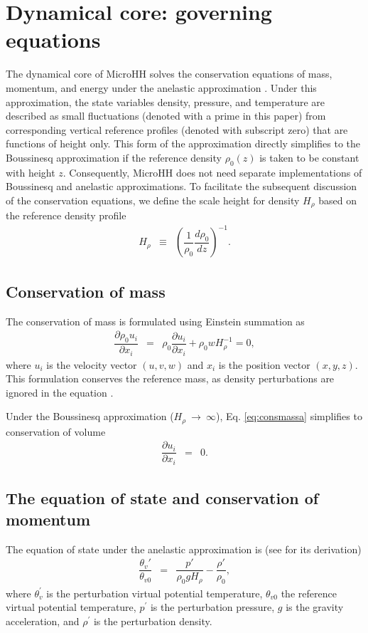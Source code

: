 \documentclass[gmd,manuscript]{copernicus}
\begin{document}
\section{Dynamical core: governing equations}\label{sec:dyncore}
The dynamical core of MicroHH solves the conservation equations of mass, momentum, and energy under the anelastic approximation \citep{Bannon1996}. Under this approximation, the state variables density, pressure, and temperature are described as small fluctuations (denoted with a prime in this paper) from corresponding vertical reference profiles (denoted with subscript zero) that are functions of height only. This form of the approximation directly simplifies to the Boussinesq approximation if the reference density $\rho_0 (z)$ is taken to be constant with height $z$. Consequently, MicroHH does not need separate implementations of Boussinesq and anelastic approximations. To facilitate the subsequent discussion of the conservation equations, we define the scale height for density $H_\rho$ based on the reference density profile
\begin{eqnarray}
H_{\rho} & \equiv & \left( \dfrac{1}{\rho_0} \dfrac{d \rho_0}{dz} \right)^{-1}.
\end{eqnarray}

\subsection{Conservation of mass}
The conservation of mass is formulated using Einstein summation as
\begin{eqnarray}
\dfrac{\partial \rho_0 u_i}{\partial x_i} & = & \rho_0 \dfrac{\partial u_i}{\partial x_i} + \rho_0 w H_{\rho}^{-1} = 0, \label{eq:consmassa}
\end{eqnarray}
where $u_i$ is the velocity vector $(u,v,w)$ and $x_i$ is the position vector $(x,y,z)$. This formulation conserves the reference mass, as density perturbations are ignored in the equation \citep{Lilly1996}.

Under the Boussinesq approximation ($H_{\rho}~\rightarrow~\infty$), Eq. \ref{eq:consmassa} simplifies to conservation of volume
\begin{eqnarray}
\dfrac{\partial u_i}{\partial x_i} & = & 0. \label{eq:consmassb}
\end{eqnarray}

\subsection{The equation of state and conservation of momentum}
The equation of state under the anelastic approximation is (see \citet{Bannon1996} for its derivation)
\begin{eqnarray}
\dfrac{\theta_v'}{\theta_{v0}} & = & \dfrac{p'}{\rho_0 g H_{\rho}} - \dfrac{\rho'}{\rho_0},\label{eq:statea}
\end{eqnarray}
where $\theta_v^\prime$ is the perturbation virtual potential temperature, $\theta_{v0}$ the reference virtual potential temperature, $p^\prime$ is the perturbation pressure, $g$ is the gravity acceleration, and $\rho^\prime$ is the perturbation density.
\end{document}
